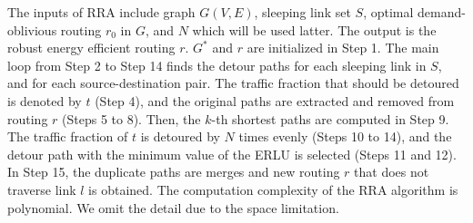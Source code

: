 \documentclass[conference]{IEEEtran}
\newcommand{\ignore}[1]{{}}
\begin{document}
The inputs of RRA include graph $G(V,E)$, sleeping link set $S$, optimal demand-oblivious routing $r_0$ in $G$, and $N$ which will be used latter. The output is the robust energy efficient routing $r$. $G^*$ and $r$ are initialized in Step 1. The main loop from Step 2 to Step 14 finds the detour paths for each sleeping link in $S$, and for each source-destination pair. The traffic fraction that should be detoured is denoted by $t$ (Step 4), and the original paths are extracted and removed from routing $r$ (Steps 5 to 8). Then, the $k$-th shortest paths are computed in Step 9. The traffic fraction of $t$ is detoured by $N$ times evenly (Steps 10 to 14), and the detour path with the minimum value of the ERLU is selected (Steps 11 and 12). In Step 15, the duplicate paths are merges and new routing $r$ that does not traverse link $l$ is obtained. The computation complexity of the RRA algorithm is polynomial. We omit the detail due to the space limitation.
\ignore{
$O((|E|-|V|)|V|^2(|R||E| + K|V|(|E| + |V|\log|V|) + N(|E||V|^2 + K|E|) + |R||E|))$ in the worst case, where $O(|E|-|V|)$ is the maximum number of sleeping links, $O(|V|^2)$ is the maximum
number of OD pairs, $O(|R||E|)$ is for computing detoured traffic and remove failed paths where $O(|R|)$ is the number of input routings, $O(K|V|(|E| + |V|\log|V|))$ is for solving the
yens algorithm where $K$ is the number of shortest paths, $O(N(|E||V|^2 + K|E|))$ is for detouring traffic fraction by $N$ times, and $O(|R||E|)$ is for merging routings.}
\end{document}

